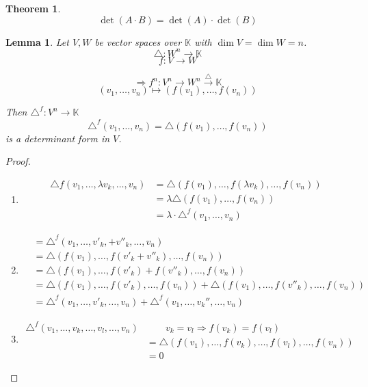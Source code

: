 \documentclass[a4paper,landscape,twocolumn]{article}
\newtheorem{theorem}{Theorem}
\newtheorem{lemma}{Lemma}
\begin{document}
\begin{theorem}
  \[ \det(A \cdot B) = \det(A) \cdot \det(B) \]
\end{theorem}
\begin{lemma}
  \label{lemma-7.25}
  Let $V, W$ be vector spaces over $\mathbb K$ with $\dim{V} = \dim{W} = n$.
  \[ \triangle: W^n \to \mathbb K \]
  \[ f: V \to W \]

  \[ \Rightarrow f^n: V^n \to W^n \overset{\triangle}\to \mathbb K \]
  \[ (v_1, \ldots, v_n) \mapsto (f(v_1), \ldots, f(v_n)) \]

  Then $\triangle^f: V^n \to \mathbb K$
  \[ \triangle^f(v_1, \ldots, v_n) = \triangle(f(v_1), \ldots, f(v_n)) \]
  is a determinant form in $V$.
\end{lemma}
\begin{proof}
  \begin{enumerate}
    \item
      \begin{align*}
        \triangle f(v_1, \ldots, \lambda v_k, \ldots, v_n)
          &= \triangle(f(v_1), \ldots, f(\lambda v_k), \ldots, f(v_n)) \\
          &= \lambda \triangle(f(v_1), \ldots, f(v_n)) \\
          &= \lambda \cdot \triangle^f (v_1, \ldots, v_n)
      \end{align*}
    \item
      \begin{align*}
          &= \triangle^f (v_1, \ldots, v'_k, + v''_k, \ldots, v_n) \\
          &= \triangle(f(v_1), \ldots, f(v'_k + v''_k), \ldots, f(v_n)) \\
          &= \triangle(f(v_1), \ldots, f(v'_k) + f(v''_k), \ldots, f(v_n)) \\
          &= \triangle(f(v_1), \ldots, f(v'_k), \ldots, f(v_n)) + \triangle(f(v_1), \ldots, f(v''_k), \ldots, f(v_n)) \\
          &= \triangle^f(v_1, \ldots, v'_k, \ldots, v_n) + \triangle^f(v_1, \ldots, v_k'', \ldots, v_n)
      \end{align*}
    \item
      \begin{align*}
        \triangle^f (v_1, \ldots, v_k, \ldots, v_l, \ldots, v_n) &\qquad v_k = v_l \Rightarrow f(v_k) = f(v_l) \\
          &= \triangle(f(v_1), \ldots, f(v_k), \ldots, f(v_l), \ldots, f(v_n)) \\
          &= 0
      \end{align*}
  \end{enumerate}
\end{proof}
\end{document}

